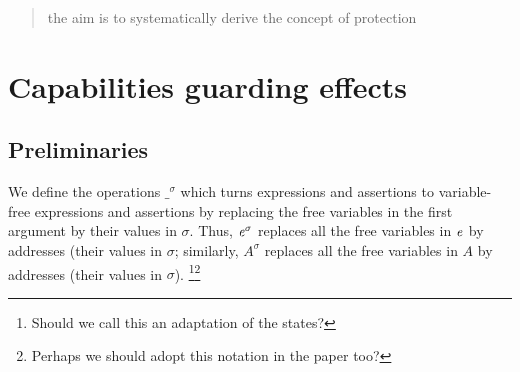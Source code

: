 \documentclass[acmsmall,review,anonymous,screen]{acmart}\settopmatter{printfolios=true,printacmref=false}
\begin{document}


\newcommand{\ExtCallsOn}[1]{ {\mathcal E}\!\mathit{xt}{\mathcal C}\!\mathit{ll}{\mathcal O\!}\mathit{n}(#1)}
\newcommand{\callsOn}[1] {{\ensuremath{\mathcal C}\!{\mathit{lld}}(#1)}}
\newcommand{\enrich}[1] {{\ensuremath{#1}^{+\!\!+}}} %
\newcommand{\as}[2]{#1^{#2}}
\newcommand{\preserve}[1]{\oopenBr\, #1\ccloseBr}

\newcommand{\Guards}[2]{{\mathcal G}\!\mathit{uards}( {#1}, {#2})}


\begin{abstract}

the aim is to systematically derive the concept of protection
\end{abstract}

\maketitle 

\section{Capabilities guarding effects}

\subsection{Preliminaries}

We define the operations $\as {\_} {\sigma}$ which turns expressions and assertions to variable-free expressions and assertions by 
replacing  the free variables in the first argument by their values in $\sigma$.
Thus,
 $\as {\re} {\sigma}$  replaces all the free variables in $\mathit{e}$ by addresses (their values in $\sigma$; similarly,
  $\as {A} {\sigma}$  replaces all the free variables in $A$ by addresses (their values in $\sigma$).
 \footnote{Should we call this an adaptation of the states?}\footnote{Perhaps we should adopt this notation in the paper too?}
\end{document}
